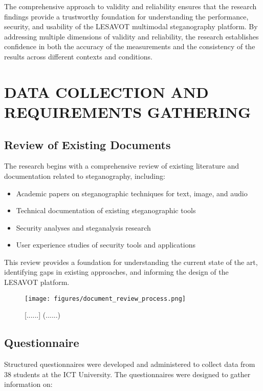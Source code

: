 \documentclass[12pt, a4paper, oneside]{book}
\begin{document}
The comprehensive approach to validity and reliability ensures that the research findings provide a trustworthy foundation for understanding the performance, security, and usability of the LESAVOT multimodal steganography platform. By addressing multiple dimensions of validity and reliability, the research establishes confidence in both the accuracy of the measurements and the consistency of the results across different contexts and conditions.

\section{DATA COLLECTION AND REQUIREMENTS GATHERING}

\subsection{Review of Existing Documents}
The research begins with a comprehensive review of existing literature and documentation related to steganography, including:

\begin{itemize}[leftmargin=*]
    \item Academic papers on steganographic techniques for text, image, and audio
    \item Technical documentation of existing steganographic tools
    \item Security analyses and steganalysis research
    \item User experience studies of security tools and applications
\end{itemize}

This review provides a foundation for understanding the current state of the art, identifying gaps in existing approaches, and informing the design of the LESAVOT platform.

\begin{figure}[htbp]
    \centering
    \texttt{[image: figures/document\_review\_process.png]}
    \caption{[......] (......)}
    \label{fig:document_review}
\end{figure}

\subsection{Questionnaire}
Structured questionnaires were developed and administered to collect data from 38 students at the ICT University. The questionnaires were designed to gather information on:
\end{document}
